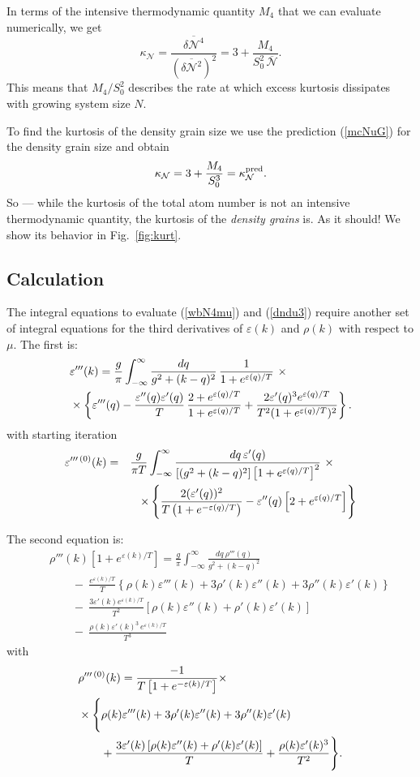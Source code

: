 \documentclass[aps,twocolumn,pra,superscriptaddress,nofootinbib,amsmath,amssymb,floats,floatfix,english]{revtex4-1}
\newcommand{\mc}[1]{{\mathcal{#1}}}
\newcommand{\wb}[1]{{\overline{#1}}}
\newcommand{\nonu}{\nonumber}
\newcommand{\eqn}[1]{(\ref{#1})}
\renewcommand{\eq}[2]{\begin{equation}\label{#1}#2\end{equation}}
\newcommand{\eqa}[2]{\begin{eqnarray}#2\label{#1}\end{eqnarray}}
\newcommand{\ve}{\varepsilon}
\begin{document}
In terms of the intensive thermodynamic quantity $M_4$ that we can evaluate numerically,
we get
\eq{mcK}{
\kappa_{\mc{N}} = \frac{\wb{\delta\mc{N}^4}}{(\wb{\delta\mc{N}^2})^2} = 3 + \frac{M_4}{S_0^2\,\wb{\mc{N}}}. 
}
This means that $M_4/S_0^2$ describes the rate at which excess kurtosis dissipates with growing system size $N$.

To find the kurtosis of the density grain size we use the prediction \eqn{mcNuG} for the density grain size and obtain
\eq{mcZuG}{
\kappa_{\mc{N}} = 3 + \frac{M_4}{S_0^3}=\kappa_{\mc{N}}^{\rm pred}.
}
So --- while the kurtosis of the total atom number is not an intensive thermodynamic quantity, the kurtosis of the \emph{density grains} is. As it should! 
We show its behavior in Fig.~\ref{fig:kurt}.


\subsection{Calculation}
\label{CALC4}
The integral equations to evaluate  \eqn{wbN4mu} and \eqn{dndu3} require another set of integral equations for the third derivatives of $\ve(k)$ and $\rho(k)$ with respect to $\mu$. 
The first is:
\eqa{dddek-ieq}{
\lefteqn{\ve'''(k) =\dfrac{g}{\pi}\displaystyle\int_{-\infty}^{\infty} \dfrac{dq}{g^2+(k-q)^2}\,\dfrac{1}{1+e^{\ve(q)/T}}\ \times}&\qquad\\
& \times
\left\{ \ve'''(q) -\dfrac{\ve''(q)\ve'(q)}{T}\,\dfrac{2+e^{\ve(q)/T}}{1+e^{\ve(q)/T}}+\dfrac{2\ve'(q)^3e^{\ve(q)/T}}{T^2(1+e^{\ve(q)/T})^2}
\right\}.\nonu
}
with starting iteration
\eqa{ddditer0}{
\ve^{\prime\prime\prime\,(0)}(k) &=& \frac{g}{\pi T} \int_{-\infty}^{\infty} \frac{dq\,\ve'(q)}{\left[(g^2+(k-q)^2\right]\left[1+e^{\ve(q)/T}\right]^2}\ \times\qquad\nonu\\ 
&&\hspace*{-1em}\times \left\{
\dfrac{2(\ve'(q))^2}{T\left(1+e^{-\ve(q)/T}\right)} -\ve''(q)\left[2+e^{\ve(q)/T}\right]
\right\}
}

The second equation is:
\eqa{dddrhok-ieq}{
&&\rho'''(k)\left[1+e^{\ve(k)/T}\right] = \frac{g}{\pi} \int_{-\infty}^{\infty} \frac{dq\ \rho'''(q)}{g^2+(k-q)^2} 
\qquad\nonu\\
&&\qquad -\ \frac{e^{\ve(k)/T}}{T}
\left\{\rho(k)\ve'''(k)+3\rho'(k)\ve''(k)+3\rho''(k)\ve'(k)\right\}\nonu\\
&&\qquad -\  \frac{3\ve'(k)e^{\ve(k)/T}}{T^2}\left[\rho(k)\ve''(k)+\rho'(k)\ve'(k)\right]\nonu\\
&&\qquad-\ \frac{\rho(k)\ve'(k)^3\,e^{\ve(k)/T}}{T^3}
}
with
\eqa{ddditer0-rho}{
\lefteqn{\rho^{\prime\prime\prime\,(0)}(k) =\dfrac{-1}{T\left[1+e^{-\ve(k)/T}\right]}\times}&\\
& \times   \Bigg\{ 
\rho(k)\ve'''(k)+3\rho'(k)\ve''(k)+3\rho''(k)\ve'(k) \nonu\\
&\qquad+ \dfrac{3\ve'(k)\left[\rho(k)\ve''(k)+\rho'(k)\ve'(k)\right]}{T} + \dfrac{\rho(k)\ve'(k)^3}{T^2}
\Bigg\}.\nonu
}
\end{document}
